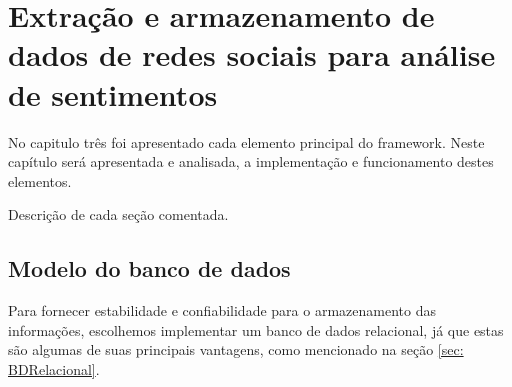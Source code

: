 \chapter{Extração e armazenamento de dados de redes sociais para análise de sentimentos}
\label{cha: Extracao}


    No capitulo três foi apresentado cada elemento principal do framework. Neste capítulo será apresentada e analisada, a implementação e funcionamento destes elementos.

Descrição de cada seção comentada.


\section{Modelo do banco de dados}
\label{sec: Modelo}
Para fornecer estabilidade e confiabilidade para o armazenamento das informações, escolhemos implementar um banco de dados relacional, já que estas são algumas de suas principais vantagens, como mencionado na seção \ref{sec: BDRelacional}.

